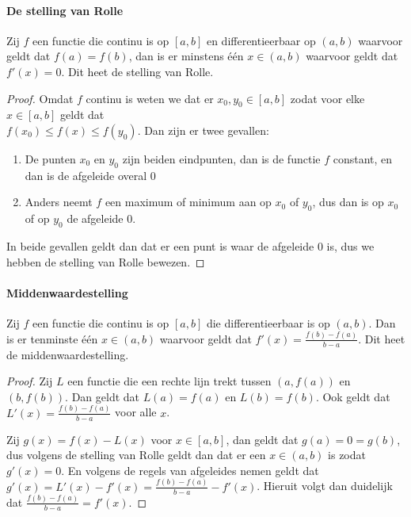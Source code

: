 \label{sec:AE}
\paragraph{De stelling van Rolle} Zij $f$ een functie die continu is op $[a,b]$ en differentieerbaar op $(a,b)$ waarvoor geldt dat $f(a)=f(b)$, dan is er minstens één $x\in(a,b)$ waarvoor geldt dat $f'(x)=0$. Dit heet de stelling van Rolle.

\begin{proof}
  Omdat $f$ continu is weten we dat er $x_{0},y_{0}\in[a,b]$ zodat voor elke $x\in[a,b]$ geldt dat\\ $f(x_{0})\leq f(x)\leq f(y_{0})$. Dan zijn er twee gevallen:

  \begin{enumerate}
    \setlength\itemsep{0em}
    \item De punten $x_{0}$ en $y_{0}$ zijn beiden eindpunten, dan is de functie $f$ constant, en dan is de afgeleide overal $0$
    \item Anders neemt $f$ een maximum of minimum aan op $x_{0}$ of $y_{0}$, dus dan is op $x_{0}$ of op $y_{0}$ de afgeleide $0$.
  \end{enumerate}

  \noindent In beide gevallen geldt dan dat er een punt is waar de afgeleide $0$ is, dus we hebben de stelling van Rolle bewezen.
\end{proof}

\paragraph{Middenwaardestelling} Zij $f$ een functie die continu is op $[a,b]$ die differentieerbaar is op $(a,b)$. Dan is er tenminste één $x\in(a,b)$ waarvoor geldt dat $f'(x)=\frac{f(b)-f(a)}{b-a}$. Dit heet de middenwaardestelling.

\begin{proof}

Zij $L$ een functie die een rechte lijn trekt tussen $(a,f(a))$ en $(b,f(b))$. Dan geldt dat $L(a)=f(a)$ en $L(b)=f(b)$. Ook geldt dat $L'(x)=\frac{f(b)-f(a)}{b-a}$ voor alle $x$. \medskip

\noindent Zij $g(x)=f(x)-L(x)$ voor $x\in[a,b]$, dan geldt dat $g(a)=0=g(b)$, dus volgens de stelling van Rolle geldt dan dat er een $x\in(a,b)$ is zodat $g'(x)=0$. En volgens de regels van afgeleides nemen geldt dat $g'(x)=L'(x)-f'(x)=\frac{f(b)-f(a)}{b-a}-f'(x)$. Hieruit volgt dan duidelijk dat $\frac{f(b)-f(a)}{b-a}=f'(x)$.

\end{proof}
